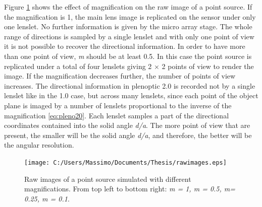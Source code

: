   Figure \ref{fig:rawpleno201} shows the effect of magnification on the raw image of a point source. If the magnification is 1, the main lens image is replicated on the sensor under only one lenslet. No further information is given by the micro array stage. The whole range of directions is sampled by a single lenslet and with only one point of view it is not possible to recover the directional information. In order to have more than one point of view, \textit{m} should be at least 0.5. In this case the point source is replicated under a total of four lenslets giving 2 $\times$ 2 points of view to render the image. If the magnification decreases further, the number of points of view increases. The directional information in plenoptic 2.0 is recorded not by a single lenslet like in the 1.0 case, but across many lenslets, since each point of the object plane is imaged by a number of lenslets proportional to the inverse of the magnification \ref{eq:pleno20}. Each lenslet samples a part of the directional coordinates contained into the solid angle \textit{d/a}. The more point of view that are present, the smaller will be the solid angle \textit{d/a}, and therefore, the better will be the angular resolution. \cite{lumsdaine2009focused}
   \begin{figure}[H]
  	\centering
  	\texttt{[image: C:/Users/Massimo/Documents/Thesis/rawimages.eps]}
  	\caption{\label{fig:rawpleno201}Raw images of a point source simulated with different magnifications. From top left to bottom right: \textit{m = 1, m = 0.5, m= 0.25, m = 0.1}. }
  \end{figure}
  \newpage
